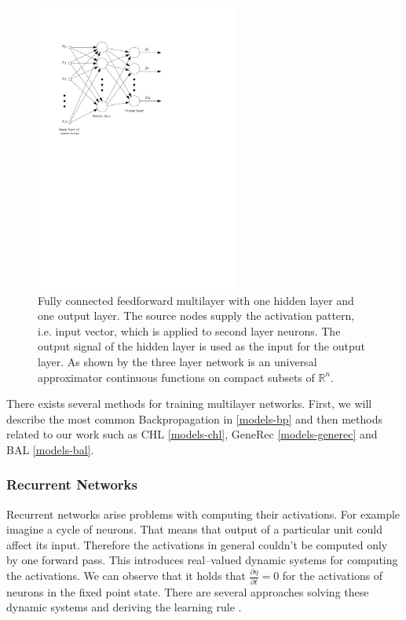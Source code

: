 \begin{figure}[H]
  \centering
  \includegraphics[width=0.6\textwidth]{img/multilayer.pdf}    
  \caption{Fully connected feedforward multilayer with one hidden layer and one output layer. The source nodes supply the activation pattern, i.e. input vector, which is applied to second layer neurons. The output signal of the hidden layer is used as the input for the output layer. As shown by \citet{cybenko1989approximation} the three layer network is an universal approximator continuous functions on compact subsets of $\mathbb{R}^n$.} 
  \label{fig:multilayer}
\end{figure}

There exists several methods for training multilayer networks. First, we will describe the most common Backpropagation in \ref{models-bp} and then methods related to our work such as CHL \ref{models-chl}, GeneRec \ref{models-generec} and BAL \ref{models-bal}. 

\subsubsection{Recurrent Networks}

Recurrent networks arise problems with computing their activations. For example imagine a cycle of neurons. That means that output of a particular unit could affect its input. Therefore the activations in general couldn't be computed only by one forward pass. This introduces real--valued dynamic systems for computing the activations. We can observe that it holds that $\frac{\partial\eta}{\partial t} = 0$ for the activations of neurons in the fixed point state. There are several approaches solving these dynamic systems and deriving the learning rule \cite{pineda1987generalization, pearlmutter1989learning, williams1989learning, elman1990finding, haykin1994neural}. 

